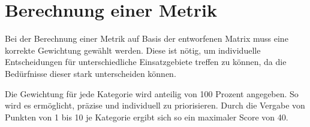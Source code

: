 \section{Berechnung einer Metrik}
\label{ch:matrix:berechnung}
Bei der Berechnung einer Metrik auf Basis der entworfenen Matrix muss eine korrekte Gewichtung gewählt werden. 
Diese ist nötig, um individuelle Entscheidungen für unterschiedliche Einsatzgebiete treffen zu können,
da die Bedürfnisse dieser stark unterscheiden können. 

Die Gewichtung für jede Kategorie wird anteilig von 100 Prozent angegeben.
So wird es ermöglicht, präzise und individuell zu priorisieren.
Durch die Vergabe von Punkten von 1 bis 10 je Kategorie ergibt sich so ein maximaler Score von 40.




